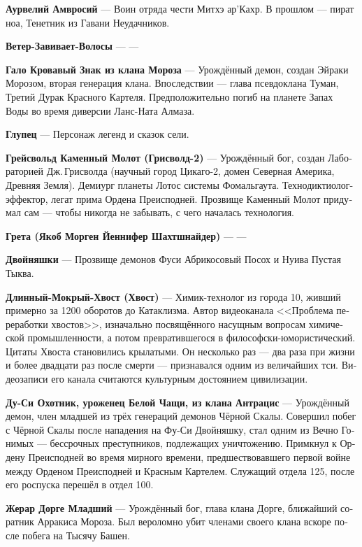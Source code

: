 \documentclass[a4paper,12pt,fleqn]{book}\usepackage{cooltooltips}\usepackage{polyglossia}\setdefaultlanguage[babelshorthands=true]{russian}\setotherlanguage{english}\defaultfontfeatures{Ligatures=TeX,Mapping=tex-text} \usepackage{xcolor}\definecolor{lightgray}{HTML}{bbbbbb}\color{lightgray}\newcommand{\ml}[3]{\textenglish{\textcolor{black}{#3}}}
\newcommand{\theterm}[3]{\textbf{\hypertarget{#1}{#2}} --- #3}
\begin{document}
{\theterm{aurweli} %
{Аурвелий Амвросий}
{Воин отряда чести Митхэ ар'Кахр.
В прошлом --- пират ноа, Тенетник из Гавани Неудачников.}

\theterm{wind-curling-hair} %
{Ветер-Завивает-Волосы}
{---}

\theterm{jalo}
{Гало Кровавый Знак из клана Мороза}
{Урождённый демон, создан Эйраки Морозом, вторая генерация клана.
Впоследствии --- глава псевдоклана Туман, Третий Дурак Красного Картеля.
Предположительно погиб на планете Запах Воды во время диверсии Ланс-Ната Алмаза.}

\theterm{fool}
{Глупец}
{Персонаж легенд и сказок сели.}

\theterm{grejsvolt} %
{Грейсвольд Каменный Молот (Грисволд-2)}
{Урождённый бог, создан Лабораторией Дж.\,Грисволда (научный город Цикаго-2, домен Северная Америка, Древняя Земля).
Демиург планеты Лотос системы Фомальгаута.
Технодиктиолог-эффектор, легат прима Ордена Преисподней.
Прозвище Каменный Молот придумал сам --- чтобы никогда не забывать, с чего началась технология.}

\theterm{greta}
{Грета (Якоб Морген Йеннифер Шахтшнайдер)}
{---}

\theterm{siblings} %
{Двойняшки}
{Прозвище демонов Фуси Абрикосовый Посох и Нуива Пустая Тыква.}

\theterm{long-moist-tail}
{Длинный-Мокрый-Хвост (Хвост)}
{Химик-технолог из города 10, живший примерно за 1200 оборотов до Катаклизма.
Автор видеоканала <<Проблема переработки хвостов>>, изначально посвящённого насущным вопросам химической промышленности, а потом превратившегося в философски-юмористический.
Цитаты Хвоста становились крылатыми.
Он несколько раз --- два раза при жизни и более двадцати раз после смерти --- признавался одним из величайших тси.
Видеозаписи его канала считаются культурным достоянием цивилизации.}

\theterm{du-xi} %
{Ду-Си Охотник, уроженец Белой Чащи, из клана Антрацис}
{Урождённый демон, член младшей из трёх генераций демонов Чёрной Скалы.
Совершил побег с Чёрной Скалы после нападения на Фу-Си Двойняшку, стал одним из Вечно Гонимых --- бессрочных преступников, подлежащих уничтожению.
Примкнул к Ордену Преисподней во время мирного времени, предшествовавшего первой войне между Орденом Преисподней и Красным Картелем.
Служащий отдела 125, после его роспуска перешёл в отдел 100.}

\theterm{dourgue-junior} %
{Жерар Дорге Младший}
{Урождённый бог, глава клана Дорге, ближайший соратник Арракиса Мороза.
Был вероломно убит членами своего клана вскоре после побега на Тысячу Башен.}

}
\end{document}
